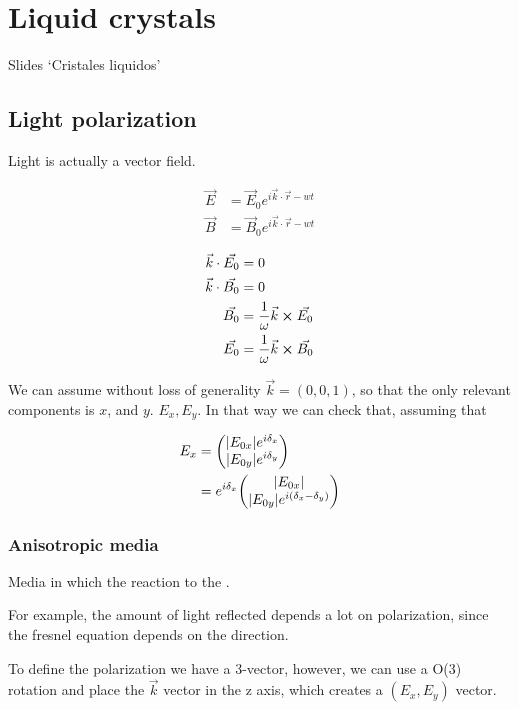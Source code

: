 \documentclass[../main/main.tex]{subfiles}
\begin{document}
\chapter{Liquid crystals}
Slides `Cristales liquidos'

\section{Light polarization}

Light is actually a vector field.

\begin{align*}
\vec{E} &= \vec{E}_{0} e ^{i \vec{k}\cdot \vec{r} - wt }\\
\vec{B} &= \vec{B}_{0} e ^{i \vec{k}\cdot \vec{r} - wt }
\end{align*}

\begin{align*}
\vec{k}\cdot \vec{E_{0}} &= 0 \\
\vec{k}\cdot \vec{B_{0}} &= 0 \\
\vec{B_{0}} &= \frac 1 \omega \vec{k} \cross \vec{E_{0}} \\
\vec{E_{0}} &= \frac 1 \omega \vec{k} \cross \vec{B_{0}}
\end{align*}

We can assume without loss of generality $\vec{k} = (0,0,1)$, so that the only relevant components is $x$, and $y$. $E_{x}, E_{y}$. In that way we can check that, assuming that

\begin{align*}
E_{x} &= \mqty( \abs{E_{0x}} e ^{i \delta_{x}} \\ \abs{E_{0y}} e ^{i \delta_{y}} ) \\
 &  =e^{i \delta_{x}} \mqty( \abs{E_{0x}}  \\ \abs{E_{0y}} e ^{i ( \delta_{x} - \delta_{y})} ) \\
\end{align*}



\subsection{Anisotropic media}

Media in which the reaction to the .

For example, the amount of light reflected depends a lot on polarization, since the fresnel equation depends on the direction.

To define the polarization we have a 3-vector, however, we can use a O(3) rotation and place the $\vec{k}$ vector in the z axis, which creates a $(E_x, E_y)$ vector.
\end{document}
